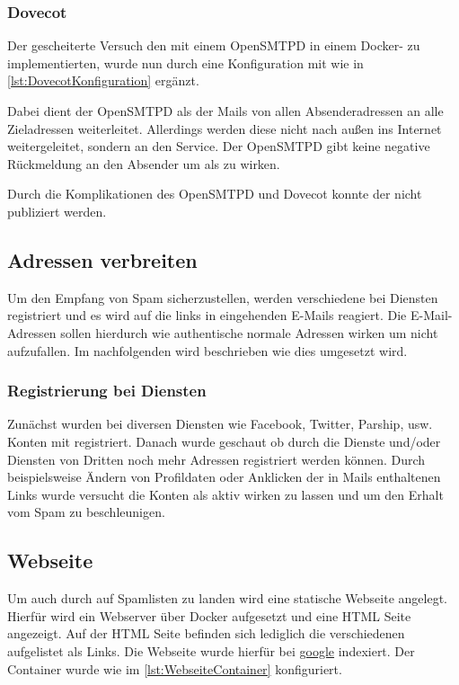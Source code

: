 \documentclass[a4paper,11pt,singlespacing]{article}
\begin{document}
		\subsubsection{Dovecot}\label{OpenRelayDovecot}
			Der gescheiterte Versuch den  mit einem \textsf{OpenSMTPD} in einem Docker- zu implementierten, wurde nun durch eine Konfiguration mit  wie in \autoref{lst:DovecotKonfiguration} ergänzt.

			Dabei dient der \textsf{OpenSMTPD} als  der Mails von allen Absenderadressen an alle Zieladressen weiterleitet.
			Allerdings werden diese nicht nach au{\ss}en ins Internet weitergeleitet, sondern an den  Service.
			Der \textsf{OpenSMTPD} gibt keine negative Rückmeldung an den Absender um als  zu wirken.

			Durch die Komplikationen des \textsf{OpenSMTPD} und \textsf{Dovecot} konnte der  nicht publiziert werden.

		\subsection{Adressen verbreiten}\label{sec:UmsetzungAdressenverbreiten}
			Um den Empfang von Spam sicherzustellen, werden verschiedene  bei Diensten registriert und es wird auf die links in eingehenden E-Mails reagiert.
			Die E-Mail-Adressen sollen hierdurch wie authentische normale Adressen wirken um nicht aufzufallen.
			Im nachfolgenden wird beschrieben wie dies umgesetzt wird.

		\subsubsection{Registrierung bei Diensten}\label{AdressenVerbreitenRegistrierenDiensten}
			Zunächst wurden bei diversen Diensten wie Facebook, Twitter, Parship, usw. Konten mit  registriert.
			Danach wurde geschaut ob durch die Dienste und/oder Diensten von Dritten noch mehr Adressen registriert werden können.
			Durch beispielsweise Ändern von Profildaten oder Anklicken der in Mails enthaltenen Links wurde versucht die Konten als aktiv wirken zu lassen und um den Erhalt vom Spam zu beschleunigen.

	\subsection{Webseite}\label{sec:UmsetzungWebsite}
		Um auch durch  auf Spamlisten zu landen wird eine statische Webseite angelegt.
		Hierfür wird ein Webserver über Docker aufgesetzt und eine HTML Seite angezeigt.
		Auf der HTML Seite befinden sich lediglich die verschiedenen  aufgelistet als Links.
		Die Webseite wurde hierfür bei \href{https://search.google.com/search-console/welcome?utm_source=about-page}{google} indexiert.
		Der Container wurde wie im \autoref{lst:WebseiteContainer} konfiguriert.
\end{document}
